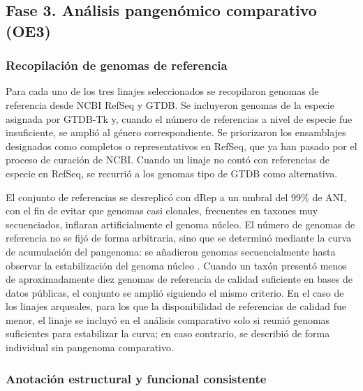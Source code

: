 \subsection{Fase 3. Análisis pangenómico comparativo (OE3)}

\subsubsection{Recopilación de genomas de referencia}

Para cada uno de los tres linajes seleccionados se recopilaron genomas de referencia desde NCBI RefSeq y GTDB. Se incluyeron genomas de la especie asignada por GTDB-Tk y, cuando el número de referencias a nivel de especie fue insuficiente, se amplió al género correspondiente. Se priorizaron los ensamblajes designados como completos o representativos en RefSeq, que ya han pasado por el proceso de curación de NCBI. Cuando un linaje no contó con referencias de especie en RefSeq, se recurrió a los genomas tipo de GTDB como alternativa.

El conjunto de referencias se desreplicó con dRep a un umbral del 99\% de ANI, con el fin de evitar que genomas casi clonales, frecuentes en taxones muy secuenciados, inflaran artificialmente el genoma núcleo. El número de genomas de referencia no se fijó de forma arbitraria, sino que se determinó mediante la curva de acumulación del pangenoma: se añadieron genomas secuencialmente hasta observar la estabilización del genoma núcleo \cite{tettelin2005}. Cuando un taxón presentó menos de aproximadamente diez genomas de referencia de calidad suficiente en bases de datos públicas, el conjunto se amplió siguiendo el mismo criterio. En el caso de los linajes arqueales, para los que la disponibilidad de referencias de calidad fue menor, el linaje se incluyó en el análisis comparativo solo si reunió genomas suficientes para estabilizar la curva; en caso contrario, se describió de forma individual sin pangenoma comparativo.

\subsubsection{Anotación estructural y funcional consistente}

